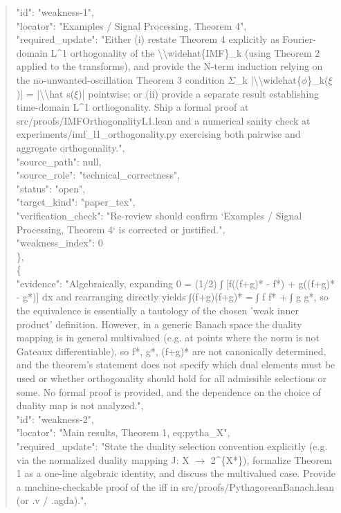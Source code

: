 \documentclass[11pt]{article}
\begin{document}
\begin{quote}
      "id": "weakness-1",\\
      "locator": "Examples / Signal Processing, Theorem 4",\\
      "required\_update": "Either (i) restate Theorem 4 explicitly as Fourier-domain L\^{}1 orthogonality of the \textbackslash{}\textbackslash{}widehat\{IMF\}\_k (using Theorem 2 applied to the transforms), and provide the N-term induction relying on the no-unwanted-oscillation Theorem 3 condition \ensuremath{\Sigma}\_k |\textbackslash{}\textbackslash{}widehat\{\ensuremath{\phi}\}\_k(\ensuremath{\xi})| = |\textbackslash{}\textbackslash{}hat s(\ensuremath{\xi})| pointwise; or (ii) provide a separate result establishing time-domain L\^{}1 orthogonality. Ship a formal proof at src/proofs/IMFOrthogonalityL1.lean and a numerical sanity check at experiments/imf\_l1\_orthogonality.py exercising both pairwise and aggregate orthogonality.",\\
      "source\_path": null,\\
      "source\_role": "technical\_correctness",\\
      "status": "open",\\
      "target\_kind": "paper\_tex",\\
      "verification\_check": "Re-review should confirm `Examples / Signal Processing, Theorem 4` is corrected or justified.",\\
      "weakness\_index": 0\\
    \},\\
    \{\\
      "evidence": "Algebraically, expanding 0 = (1/2) ∫ [f((f+g)* - f*) + g((f+g)* - g*)] dx and rearranging directly yields ∫(f+g)(f+g)* = ∫ f f* + ∫ g g*, so the equivalence is essentially a tautology of the chosen 'weak inner product' definition. However, in a generic Banach space the duality mapping is in general multivalued (e.g. at points where the norm is not Gateaux differentiable), so f*, g*, (f+g)* are not canonically determined, and the theorem's statement does not specify which dual elements must be used or whether orthogonality should hold for all admissible selections or some. No formal proof is provided, and the dependence on the choice of duality map is not analyzed.",\\
      "id": "weakness-2",\\
      "locator": "Main results, Theorem 1, eq:pytha\_X",\\
      "required\_update": "State the duality selection convention explicitly (e.g. via the normalized duality mapping J: X \ensuremath{\to} 2\^{}\{X*\}), formalize Theorem 1 as a one-line algebraic identity, and discuss the multivalued case. Provide a machine-checkable proof of the iff in src/proofs/PythagoreanBanach.lean (or .v / .agda).",\\

\end{quote}
\end{document}
